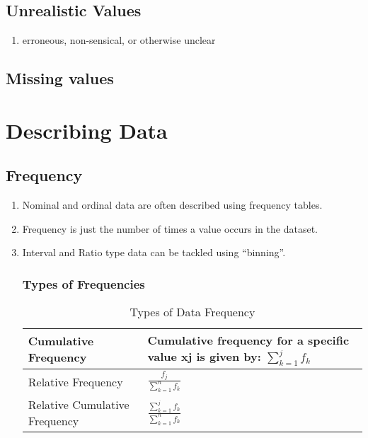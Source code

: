 \subsection{Unrealistic Values \cite{ism-1}}\label{unrealistic_values}
\begin{enumerate}
    \item erroneous, non-sensical, or otherwise unclear
\end{enumerate}

\subsection{Missing values \cite{ism-1}}\label{missing_values}

\section{Describing Data \cite{ism-1}}

\subsection{Frequency \cite{ism-1}}\label{frequency}
\begin{enumerate}
    \item Nominal and ordinal data are often described using frequency tables.
    \item Frequency is just the number of times a value occurs in the dataset.
    \item Interval and Ratio type data can be tackled using “binning”.
    \subsubsection{Types of Frequencies}
    \begin{table}[H]
        \centering
        \renewcommand{\arraystretch}{1.7}
        \begin{tabular}{|p{3.5cm}|l|}
            \hline
            Cumulative Frequency \cite{ism-1} \label{cumulative_frequency} & Cumulative frequency for a specific value xj is given by: \(\sum_{k=1}^{j} f_k\) \\ \hline
            Relative Frequency \cite{ism-1} \label{relative_frequency} & \(\displaystyle\frac{f_j}{\sum_{k=1}^{n} f_k}\) \\ \hline
            Relative Cumulative Frequency \cite{ism-1} \label{relative_cumulative_frequency} & \(\displaystyle\frac{\sum_{k=1}^{j} f_k}{\sum_{k=1}^{n} f_k}\)  \\ \hline
        \end{tabular}
        \caption{Types of Data Frequency}
    \end{table}
\end{enumerate}

